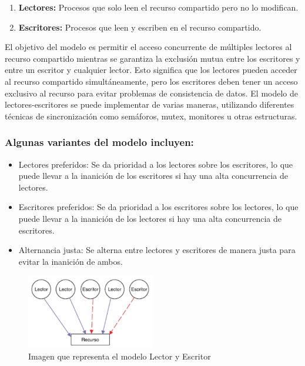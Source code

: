 \documentclass[12pt,a4paper]{article}
\begin{document}
\begin{enumerate}
    \item \textbf{Lectores:} Procesos que solo leen el recurso compartido pero no lo modifican.
    \item \textbf{Escritores:} Procesos que leen y escriben en el recurso compartido.
     
\end{enumerate}
El objetivo del modelo es permitir el acceso concurrente de múltiples lectores al recurso compartido mientras se garantiza la exclusión mutua entre los escritores y entre un escritor y cualquier lector. Esto significa que los lectores pueden acceder al recurso compartido simultáneamente, pero los escritores deben tener un acceso exclusivo al recurso para evitar problemas de consistencia de datos.
\espacio
El modelo de lectores-escritores se puede implementar de varias maneras, utilizando diferentes técnicas de sincronización como semáforos, mutex, monitores u otras estructuras.

\subsubsection*{Algunas variantes del modelo incluyen:}
\begin{itemize}
    \item Lectores preferidos: Se da prioridad a los lectores sobre los escritores, lo que puede llevar a la inanición de los escritores si hay una alta concurrencia de lectores.
    \item Escritores preferidos: Se da prioridad a los escritores sobre los lectores, lo que puede llevar a la inanición de los lectores si hay una alta concurrencia de escritores.
    \item Alternancia justa: Se alterna entre lectores y escritores de manera justa para evitar la inanición de ambos.
    
\end{itemize}

\begin{figure}[htb!]
    \centering
    \caption{Imagen que representa el modelo Lector y Escritor  } 
    \includegraphics[width=0.5\textwidth]{images/lector.png}
    
\end{figure}
\end{document}
